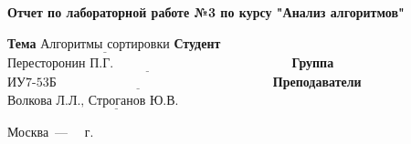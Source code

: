 \begin{titlepage}
	
	\begin{center}
		\Large\textbf{Отчет по лабораторной работе №3 по курсу "Анализ алгоритмов"}
	\end{center}
	
	\noindent\textbf{Тема} $\underline{\text{Алгоритмы сортировки}}$\newline\newline\newline
	\noindent\textbf{Студент} $\underline{\text{Пересторонин П.Г.~~~~~~~~~~~~~~~~~~~~~~~~~~~~~~~~~~~~~~~~~}}$\newline\newline
	\noindent\textbf{Группа} $\underline{\text{ИУ7-53Б~~~~~~~~~~~~~~~~~~~~~~~~~~~~~~~~~~~~~~~~~~~~~~~~~~}}$\newline\newline
	\noindent\textbf{Преподаватели} $\underline{\text{Волкова Л.Л., Строганов Ю.В.~~~~~~~~~~~}}$\newline
	
	\begin{center}
		\vfill
		Москва~---~\the\year
		~г.
	\end{center}
 \restoregeometry
\end{titlepage}
